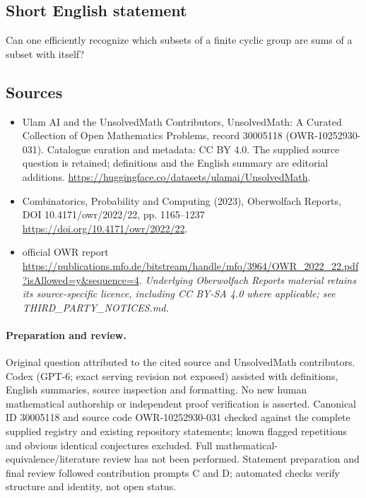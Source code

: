\documentclass[11pt]{article}
\begin{document}
\subsection{Short English statement}
Can one efficiently recognize which subsets of a finite cyclic group are sums of a subset with itself?
\subsection{Sources}
\begin{itemize}
\item[\hypertarget{source:30005118:1}{S1}] Ulam AI and the UnsolvedMath Contributors, UnsolvedMath: A Curated Collection of Open Mathematics Problems, record 30005118 (OWR-10252930-031). Catalogue curation and metadata: CC BY 4.0. The supplied source question is retained; definitions and the English summary are editorial additions.
\url{https://huggingface.co/datasets/ulamai/UnsolvedMath}.
\item[\hypertarget{source:30005118:2}{S2}] Combinatorics, Probability and Computing (2023), Oberwolfach Reports, DOI 10.4171/owr/2022/22, pp. 1165--1237
\url{https://doi.org/10.4171/owr/2022/22}.
\item[\hypertarget{source:30005118:3}{S3}] official OWR report
\url{https://publications.mfo.de/bitstream/handle/mfo/3964/OWR_2022_22.pdf?isAllowed=y&sequence=4}.
\textit{Underlying Oberwolfach Reports material retains its source-specific licence, including CC BY-SA 4.0 where applicable; see THIRD\_PARTY\_NOTICES.md.}
\end{itemize}
\paragraph{Preparation and review.}
Original question attributed to the cited source and UnsolvedMath contributors. Codex (GPT-6; exact serving revision not exposed) assisted with definitions, English summaries, source inspection and formatting. No new human mathematical authorship or independent proof verification is asserted. Canonical ID 30005118 and source code OWR-10252930-031 checked against the complete supplied registry and existing repository statements; known flagged repetitions and obvious identical conjectures excluded. Full mathematical-equivalence/literature review has not been performed. Statement preparation and final review followed contribution prompts C and D; automated checks verify structure and identity, not open status.
\label{end:30005118}
\end{document}
